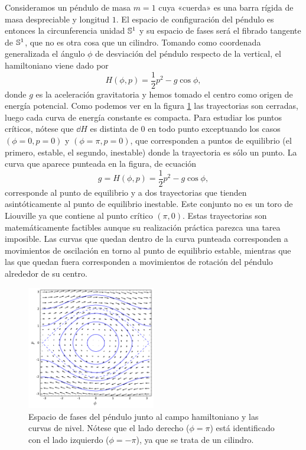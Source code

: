   Consideramos un péndulo de masa $m=1$ cuya «cuerda» es una barra rígida de masa despreciable y longitud $1$. El espacio de configuración del péndulo es entonces la circunferencia unidad $\mathbb{S}^1$ y su espacio de fases será el fibrado tangente de $\mathbb{S}^1$, que no es otra cosa que un cilindro. Tomando como coordenada generalizada el ángulo $\phi$ de desviación del péndulo respecto de la vertical, el hamiltoniano viene dado por 
  \begin{equation*}
    H(\phi,p)=\frac{1}{2}p^2 - g\cos\phi,
  \end{equation*}
  donde $g$ es la aceleración gravitatoria y hemos tomado el centro como origen de energía potencial.
  Como podemos ver en la figura \ref{fig:pendulo}  las trayectorias son cerradas, luego cada curva de energía constante es compacta. Para estudiar los puntos críticos, nótese que $\dd H$ es distinta de 0 en todo punto exceptuando los casos $(\phi=0,p=0)$ y $(\phi=\pi,p=0)$, que corresponden a puntos de equilibrio (el primero, estable, el segundo, inestable) donde la trayectoria es sólo un punto. La curva que aparece punteada en la figura, de ecuación
  \begin{equation*}
    g=H(\phi,p)=\frac{1}{2}p^2 - g \cos\phi ,
  \end{equation*}
   corresponde al punto de equilibrio y a dos trayectorias que tienden asintóticamente al punto de equilibrio inestable. Este conjunto no es un toro de Liouville ya que contiene al punto crítico $(\pi,0)$. Estas trayectorias son matemáticamente factibles aunque su realización práctica parezca una tarea imposible. Las curvas que quedan dentro de la curva punteada corresponden a movimientos de oscilación en torno al punto de equilibrio estable, mientras que las que quedan fuera corresponden a movimientos de rotación del péndulo alrededor de su centro. 
  \begin{figure}[h]
    \centering
    \includegraphics[width=0.5\textwidth]{pics/pendulo}
    \caption{\small Espacio de fases del péndulo junto al campo hamiltoniano y las curvas de nivel. Nótese que el lado derecho ($\phi=\pi$) está identificado con el lado izquierdo ($\phi=-\pi$), ya que se trata de un cilindro.}
    \label{fig:pendulo}
  \end{figure}

